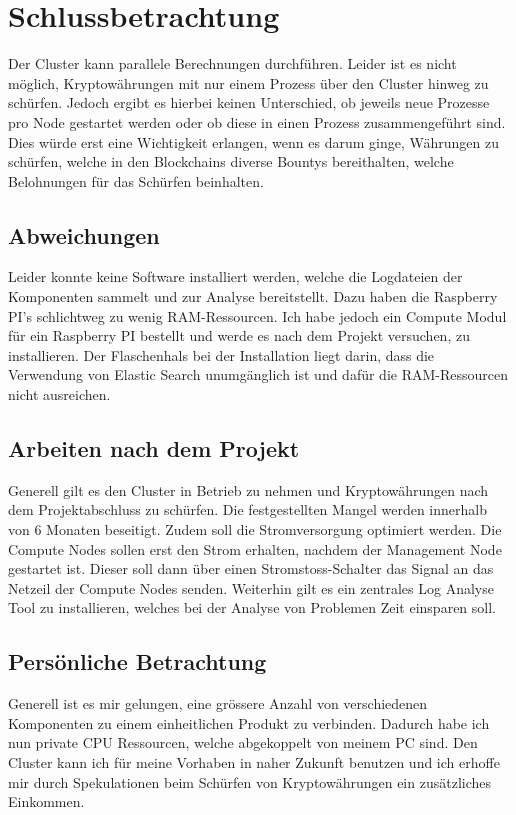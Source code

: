 
\section{Schlussbetrachtung} 
\label{sec:Schlussbetrachtung}
Der Cluster kann parallele Berechnungen durchführen. Leider ist es nicht möglich, Kryptowährungen mit nur einem Prozess über den Cluster hinweg zu schürfen. Jedoch ergibt es hierbei keinen Unterschied, ob jeweils neue Prozesse pro Node gestartet werden oder ob diese in einen Prozess zusammengeführt sind. Dies würde erst eine Wichtigkeit erlangen, wenn es darum ginge, Währungen zu schürfen, welche in den Blockchains diverse Bountys bereithalten, welche Belohnungen für das Schürfen beinhalten.

\subsection{Abweichungen}
Leider konnte keine Software installiert werden, welche die Logdateien der Komponenten sammelt und zur Analyse bereitstellt. Dazu haben die Raspberry PI's schlichtweg zu wenig RAM-Ressourcen. Ich habe jedoch ein Compute Modul für ein Raspberry PI bestellt und werde es nach dem Projekt versuchen, zu installieren. Der Flaschenhals bei der Installation liegt darin, dass die Verwendung von Elastic Search unumgänglich ist und dafür die RAM-Ressourcen nicht ausreichen.

\subsection{Arbeiten nach dem Projekt}
Generell gilt es den Cluster in Betrieb zu nehmen und Kryptowährungen nach dem Projektabschluss zu schürfen. Die festgestellten Mangel werden innerhalb von 6 Monaten beseitigt. Zudem soll die Stromversorgung optimiert werden. Die Compute Nodes sollen erst den Strom erhalten, nachdem der Management Node gestartet ist. Dieser soll dann über einen Stromstoss-Schalter das Signal an das Netzeil der Compute Nodes senden. Weiterhin gilt es ein zentrales Log Analyse Tool zu installieren, welches bei der Analyse von Problemen Zeit einsparen soll.

\subsection{Persönliche Betrachtung}
Generell ist es mir gelungen, eine grössere Anzahl von verschiedenen Komponenten zu einem einheitlichen Produkt zu verbinden. Dadurch habe ich nun private CPU Ressourcen, welche abgekoppelt von meinem PC sind. Den Cluster kann ich für meine Vorhaben in naher Zukunft benutzen und ich erhoffe mir durch Spekulationen beim Schürfen von Kryptowährungen ein zusätzliches Einkommen.
 
